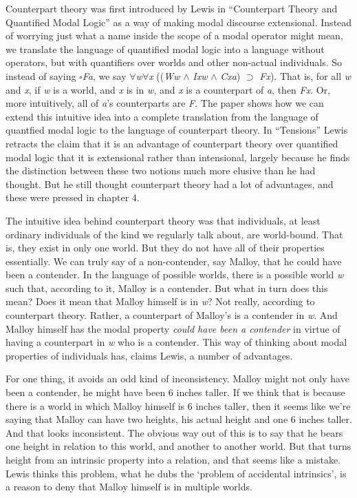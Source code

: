 Counterpart theory was first introduced by Lewis in ``Counterpart Theory and Quantified Modal Logic'' \citeyearpar{Lewis1968} as a way of making modal discourse extensional. Instead of worrying just what a name inside the scope of a modal operator might mean, we translate the language of quantified modal logic into a language without operators, but with quantifiers over worlds and other non-actual individuals. So instead of saying \(\square\)\textit{Fa}, we say \(\forall\)\textit{w}\(\forall\)\textit{x} ((\textit{Ww} \(\wedge\) \textit{Ixw} \(\wedge\) \textit{Cxa}) \(\supset\) \textit{Fx}). That is, for all \textit{w} and \textit{x}, if \textit{w} is a world, and \textit{x} is in \textit{w}, and \textit{x} is a counterpart of \textit{a}, then \textit{Fx}. Or, more intuitively, all of \textit{a}'s counterparts are \textit{F}. The paper shows how we can extend this intuitive idea into a complete translation from the language of quantfied modal logic to the language of counterpart theory. In ``Tensions'' \citeyearpar{Lewis1974a} Lewis retracts the claim that it is an advantage of counterpart theory over quantified modal logic that it is extensional rather than intensional, largely because he finds the distinction between these two notions much more elusive than he had thought. But he still thought counterpart theory had a lot of advantages, and these were pressed in chapter 4.

The intuitive idea behind counterpart theory was that individuals, at least ordinary individuals of the kind we regularly talk about, are world-bound. That is, they exist in only one world. But they do not have all of their properties essentially. We can truly say of a non-contender, say Malloy, that he could have been a contender. In the language of possible worlds, there is a possible world \textit{w} such that, according to it, Malloy is a contender. But what in turn does this mean? Does it mean that Malloy himself is in \textit{w}? Not really, according to counterpart theory. Rather, a counterpart of Malloy's is a contender in \textit{w}. And Malloy himself has the modal property \textit{could have been a contender} in virtue of having a counterpart in \textit{w} who is a contender. This way of thinking about modal properties of individuals has, claims Lewis, a number of advantages.

For one thing, it avoids an odd kind of inconsistency. Malloy might not only have been a contender, he might have been 6 inches taller. If we think that is because there is a world in which Malloy himself is 6 inches taller, then it seems like we're saying that Malloy can have two heights, his actual height and one 6 inches taller. And that looks inconsistent. The obvious way out of this is to say that he bears one height in relation to this world, and another to another world. But that turns height from an intrinsic property into a relation, and that seems like a mistake. Lewis thinks this problem, what he dubs the `problem of accidental intrinsics', is a reason to deny that Malloy himself is in multiple worlds.

